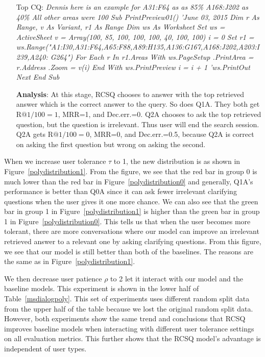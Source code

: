 \documentclass[format=acmsmall, review=False, screen=true]{acmart}
\begin{document}
\begin{itemize}
    \item[Top CQ:] \textit{Dennis here is an example for A31:F64 as as 85\% A168:J202 as 40\% All other areas were 100 Sub PrintPreview01() 'June 03, 2015 Dim r As Range, v As Variant, r1 As Range Dim ws As Worksheet Set ws = ActiveSheet v = Array(100, 85, 100, 100, 100, 40, 100, 100) i = 0 Set r1 = ws.Range("A1:I30,A31:F64,A65:F88,A89:H135,A136:G167,A168:J202,A203:I239,A240: G264") For Each r In r1.Areas With ws.PageSetup .PrintArea = r.Address .Zoom = v(i) End With ws.PrintPreview i = i + 1 'ws.PrintOut Next End Sub}
    
     \item[\textbf{Analysis}:]
    At this stage, RCSQ chooses to answer with the top retrieved answer which is the correct answer to the query. So does Q1A. They both get $\text{R@1/100}=1$, MRR=1, and Dec.err.=0. Q2A chooses to ask the top retrieved question, but the question is irrelevant. Thus user will end the search session. Q2A gets $\text{R@1/100}=0$, MRR=0, and Dec.err.=0.5, because Q2A is correct on asking the first question but wrong on asking the second.
\end{itemize}


When we increase user tolerance $\tau$ to 1, the new distribution is as shown in Figure~\ref{polydistribution1}. From the figure, we see that the red bar in group 0 is much lower than the red bar in Figure~\ref{polydistribution0} and generally, Q1A's performance is better than Q0A since it can ask fewer irrelevant clarifying questions when the user gives it one more chance. We can also see that the green bar in group 1 in Figure~\ref{polydistribution1} is higher than the green bar in group 1 in Figure~\ref{polydistribution0}. This tells us that when the user becomes more tolerant, there are more conversations where our model can improve an irrelevant retrieved answer to a relevant one by asking clarifying questions. From this figure, we see that our model is still better than both of the baselines. The reasons are the same as in Figure~\ref{polydistribution1}.

We then decrease user patience $\rho$ to 2 let it interact with our model and the baseline models. This experiment is shown in the lower half of Table~\ref{msdialogpoly}. This set of experiments uses different random split data from the upper half of the table because we lost the original random split data. However, both experiments show the same trend and conclusions that RCSQ improves baseline models when interacting with different user tolerance settings on all evaluation metrics. This further shows that the RCSQ model's advantage is independent of user types.
\end{document}
